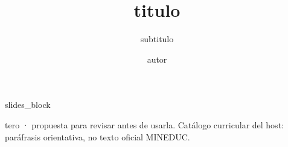\documentclass{beamer}
\title{{{titulo}}}
\subtitle{{{subtitulo}}}
\author{{{autor}}}
\begin{document}
\begin{frame}
\titlepage
\end{frame}
{{slides_block}}

\begin{frame}[plain]
\centering
{\footnotesize tero · propuesta para revisar antes de usarla. Catálogo curricular del host: paráfrasis orientativa, no texto oficial MINEDUC.}
\end{frame}
\end{document}
